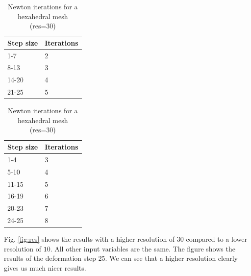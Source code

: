 \begin{table}[!htbp]
\parbox{.45\linewidth}{
\centering
\begin{tabular}{ | l | l |}
\hline
\textbf{Step size} & \textbf{Iterations} \\ \hline
1-7 & 2 \\ \hline
8-13 & 3 \\ \hline
14-20 & 4 \\ \hline
21-25 & 5 \\ \hline
\end{tabular}
\caption{Newton iterations for a tetrahedral mesh (res=30)}
\label{table:res_tet}
}
\hfill
\parbox{.45\linewidth}{
\centering
\begin{tabular}{ | l | l |}
\hline
\textbf{Step size} & \textbf{Iterations} \\ \hline
1-4 & 3 \\ \hline
5-10 & 4 \\ \hline
11-15 & 5 \\ \hline
16-19 & 6 \\ \hline
20-23 & 7 \\ \hline
24-25 & 8 \\ \hline
\end{tabular}
\caption{Newton iterations for a hexahedral mesh (res=30)}
\label{table:res_hex}
}
\end{table}

Fig. \ref{fig:res} shows the results with a higher resolution of $30$ compared to a lower resolution of $10$. All other input variables are the same. The figure shows the results of the deformation step $25$. We can see that a higher resolution clearly gives us much nicer results.

